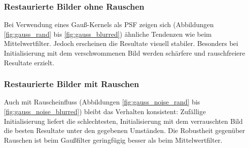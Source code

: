\subsubsection{Restaurierte Bilder ohne Rauschen}

Bei Verwendung eines Gauß-Kernels als PSF zeigen sich (Abbildungen \ref{fig:gauss_rand} bis \ref{fig:gauss_blurred}) ähnliche Tendenzen wie beim Mittelwertfilter. Jedoch erscheinen die Resultate visuell stabiler. Besonders bei Initialisierung mit dem verschwommenen Bild werden schärfere und rauschfreiere Resultate erzielt.

\noindent
\begin{minipage}[t]{0.33\textwidth}
\end{minipage}
%
\begin{minipage}[t]{0.33\textwidth}
\end{minipage}
%
\begin{minipage}[t]{0.33\textwidth}
\end{minipage}


\subsubsection{Restaurierte Bilder mit Rauschen}

Auch mit Rauscheinfluss (Abbildungen \ref{fig:gauss_noise_rand} bis \ref{fig:gauss_noise_blurred}) bleibt das Verhalten konsistent: Zufällige Initialisierung liefert die schlechtesten, Initialisierung mit dem verrauschten Bild die besten Resultate unter den gegebenen Umständen. Die Robustheit gegenüber Rauschen ist beim Gaußfilter geringfügig besser als beim Mittelwertfilter.

\noindent
\begin{minipage}[t]{0.33\textwidth}
\end{minipage}
%
\begin{minipage}[t]{0.33\textwidth}
\end{minipage}
%
\begin{minipage}[t]{0.33\textwidth}
\end{minipage}


